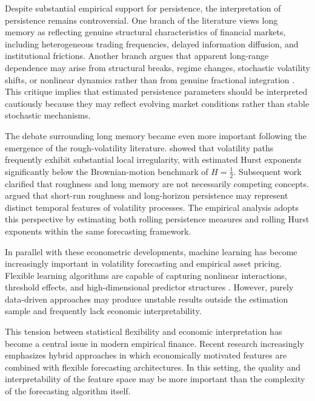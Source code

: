 \documentclass[jrfm,article,submit,moreauthors,pdftex]{Definitions/mdpi}
\begin{document}
Despite substantial empirical support for persistence, the interpretation of
persistence remains controversial. One branch of the literature views long
memory as reflecting genuine structural characteristics of financial markets,
including heterogeneous trading frequencies, delayed information diffusion,
and institutional frictions. Another branch argues that apparent long-range
dependence may arise from structural breaks, regime changes, stochastic
volatility shifts, or nonlinear dynamics rather than from genuine fractional
integration \citep{mikosch2004nonstationarities}. This critique implies that
estimated persistence parameters should be interpreted cautiously because
they may reflect evolving market conditions rather than stable stochastic
mechanisms.

The debate surrounding long memory became even more important following the
emergence of the rough-volatility literature. \citet{gatheral2018volatility}
showed that volatility paths frequently exhibit substantial local
irregularity, with estimated Hurst exponents significantly below the
Brownian-motion benchmark of $H=\frac{1}{2}$. Subsequent work clarified that
roughness and long memory are not necessarily competing concepts.
\citet{bennedsen2021decoupling} argued that short-run roughness and
long-horizon persistence may represent distinct temporal features of
volatility processes. The empirical analysis adopts
this perspective by estimating both rolling persistence measures and rolling
Hurst exponents within the same forecasting framework.

In parallel with these econometric developments, machine learning has become
increasingly important in volatility forecasting and empirical asset pricing.
Flexible learning algorithms are capable of capturing nonlinear interactions,
threshold effects, and high-dimensional predictor structures
\citep{breiman2001random,friedman2001greedy,gu2020empirical,hastie2009elements}.
However, purely data-driven approaches may produce unstable results outside
the estimation sample and frequently lack economic interpretability.

This tension between statistical flexibility and economic interpretation has
become a central issue in modern empirical finance. Recent research
increasingly emphasizes hybrid approaches in which economically motivated
features are combined with flexible forecasting architectures. In this
setting, the quality and interpretability of the feature space may be more
important than the complexity of the forecasting algorithm itself.
\end{document}

